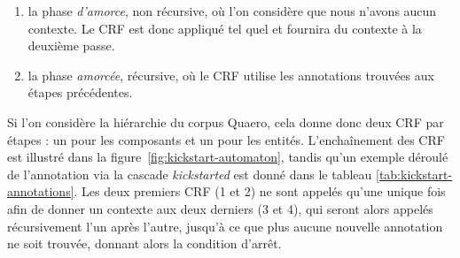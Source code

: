 \documentclass[12pt,a4paper,times,twoside,openright]{report}
\begin{document}
\begin{enumerate}
    \item la phase \emph{d'amorce}, non récursive, où l'on considère que nous n'avons aucun contexte. Le CRF est donc appliqué tel quel et fournira du contexte à la deuxième passe.
    \item la phase \emph{amorcée}, récursive, où le CRF utilise les annotations trouvées aux étapes précédentes.
\end{enumerate}

Si l'on considère la hiérarchie du corpus Quaero, cela donne donc deux CRF par étapes : un pour les composants et un pour les entités. L'enchaînement des CRF est illustré dans la figure\ \ref{fig:kickstart-automaton}, tandis qu'un exemple déroulé de l'annotation via la cascade \textit{kickstarted} est donné dans le tableau \ref{tab:kickstart-annotations}. Les deux premiers CRF (1 et 2) ne sont appelés qu'une unique fois afin de donner un contexte aux deux derniers (3 et 4), qui seront alors appelés récursivement l'un après l'autre, jusqu'à ce que plus aucune nouvelle annotation ne soit trouvée, donnant alors la condition d'arrêt.
\end{document}
